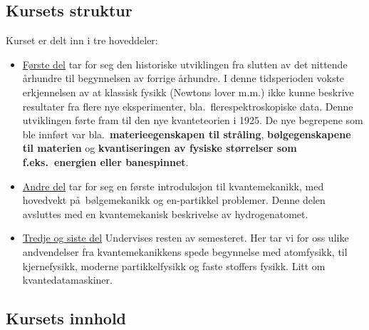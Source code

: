 \subsection*{Kursets struktur}

Kurset er delt inn i tre hoveddeler:
\begin{itemize}
   \item \underline{F\o rste del} tar for seg den historiske utviklingen fra
         slutten av det nittende \aa rhundre til begynnelsen av
         forrige \aa rhundre. I denne tidsperioden vokste
         erkjennelsen av at klassisk fysikk (Newtons lover m.m.)
         ikke kunne beskrive resultater fra flere nye eksperimenter, bla.~flerespektroskopiske data. 
          Denne utviklingen f\o rte 
         fram til den nye kvanteteorien i 1925. De nye begrepene
         som ble innf\o rt var bla.~{\bf materieegenskapen til str\aa ling}, 
         {\bf b\o lgegenskapene til materien} og {\bf kvantiseringen av
              fysiske st\o rrelser som f.eks.~energien eller banespinnet}.
    \item \underline{Andre del} tar for seg en f\o rste introduksjon til 
          kvantemekanikk, med hovedvekt p\aa\ b\o lgemekanikk
          og en-partikkel problemer. Denne delen avsluttes
          med en kvantemekanisk beskrivelse av hydrogenatomet.
    \item \underline{Tredje og siste del} Undervises resten av 
          semesteret. Her tar vi for oss ulike andvendelser  
          fra kvantemekanikkens spede begynnelse med
          atomfysikk, til kjernefysikk, moderne partikkelfysikk
          og faste stoffers fysikk. Litt om kvantedatamaskiner.
\end{itemize}  
\subsection*{Kursets innhold}

